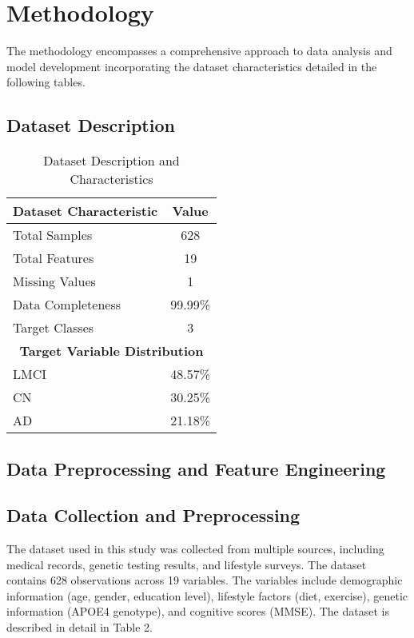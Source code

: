 \documentclass[conference]{IEEEtran}
\begin{document}
\section{Methodology}
The methodology encompasses a comprehensive approach to data analysis and model development incorporating the dataset characteristics detailed in the following tables.

\subsection{Dataset Description}

\begin{table}[!h]
\centering
\caption{Dataset Description and Characteristics}
\label{tab:dataset_description}
\begin{tabular}{|l|c|}
\hline
\textbf{Dataset Characteristic} & \textbf{Value} \\
\hline
Total Samples & 628 \\
\hline
Total Features & 19 \\
\hline
Missing Values & 1 \\
\hline
Data Completeness & 99.99\% \\
\hline
Target Classes & 3 \\
\hline
\hline
\multicolumn{2}{|c|}{\textbf{Target Variable Distribution}} \\
\hline
LMCI & 48.57\% \\
\hline
CN & 30.25\% \\
\hline
AD & 21.18\% \\
\hline
\end{tabular}
\end{table}



\subsection{Data Preprocessing and Feature Engineering}
\subsection{Data Collection and Preprocessing}

The dataset used in this study was collected from multiple sources, including medical records, genetic testing results, and lifestyle surveys. The dataset contains 628 observations across 19 variables. The variables include demographic information (age, gender, education level), lifestyle factors (diet, exercise), genetic information (APOE4 genotype), and cognitive scores (MMSE). The dataset is described in detail in Table 2.
\end{document}
